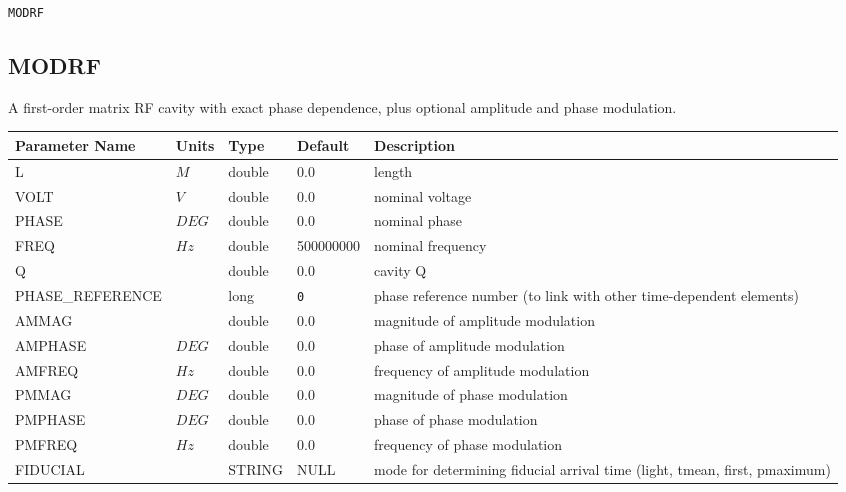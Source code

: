 \begin{latexonly}
\newpage
\begin{center}{\Large\verb|MODRF|}\end{center}
\end{latexonly}\subsection{MODRF}
A first-order matrix RF cavity with exact phase dependence, plus optional amplitude
and phase modulation.
\\
\begin{tabular}{|l|l|l|l|p{\descwidth}|} \hline
Parameter Name & Units & Type & Default & Description \\ \hline 
L & $M$ & double &  0.0 & length  \\ \hline 
VOLT & $V$ & double &  0.0 & nominal voltage  \\ \hline 
PHASE & $DEG$ & double &  0.0 & nominal phase  \\ \hline 
FREQ & $Hz$ & double &   500000000 & nominal frequency  \\ \hline 
Q &  & double &  0.0 & cavity Q  \\ \hline 
PHASE\_REFERENCE &  & long &  \verb|0| & phase reference number (to link with other time-dependent elements)  \\ \hline 
AMMAG &  & double &  0.0 & magnitude of amplitude modulation  \\ \hline 
AMPHASE & $DEG$ & double &  0.0 & phase of amplitude modulation  \\ \hline 
AMFREQ & $Hz$ & double &  0.0 & frequency of amplitude modulation  \\ \hline 
PMMAG & $DEG$ & double &  0.0 & magnitude of phase modulation  \\ \hline 
PMPHASE & $DEG$ & double &  0.0 & phase of phase modulation  \\ \hline 
PMFREQ & $Hz$ & double &  0.0 & frequency of phase modulation  \\ \hline 
FIDUCIAL &  & STRING &   NULL            & mode for determining fiducial arrival time (light, tmean, first, pmaximum)  \\ \hline 
\end{tabular}

